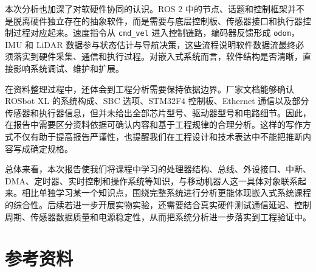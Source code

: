 \documentclass[UTF8,a4paper,12pt]{ctexrep}
\begin{document}
本次分析也加深了对软硬件协同的认识。ROS 2 中的节点、话题和控制框架并不是脱离硬件独立存在的抽象软件，而是需要与底层控制板、传感器接口和执行器控制过程对应起来。速度指令从 \texttt{cmd\_vel} 进入控制链路，编码器反馈形成 \texttt{odom}，IMU 和 LiDAR 数据参与状态估计与导航决策，这些流程说明软件数据流最终必须落实到硬件采集、通信和执行过程。对嵌入式系统而言，软件结构是否清晰，直接影响系统调试、维护和扩展。

在资料整理过程中，还体会到工程分析需要保持依据边界。厂家文档能够确认 ROSbot XL 的系统构成、SBC 选项、STM32F4 控制板、Ethernet 通信以及部分传感器和执行器信息，但并未给出全部芯片型号、驱动器型号和电路细节。因此，在报告中需要区分资料依据可确认内容和基于工程规律的合理分析。这样的写作方式不仅有助于提高报告严谨性，也提醒我们在工程设计和技术表达中不能把推断内容写成确定规格。

总体来看，本次报告使我们将课程中学习的处理器结构、总线、外设接口、中断、DMA、定时器、实时控制和操作系统等知识，与移动机器人这一具体对象联系起来。相比单独学习某一个知识点，围绕完整系统进行分析更能体现嵌入式系统课程的综合性。后续若进一步开展实物实验，还需要结合真实硬件测试通信延迟、控制周期、传感器数据质量和电源稳定性，从而把系统分析进一步落实到工程验证中。

\chapter*{参考资料}
\end{document}
